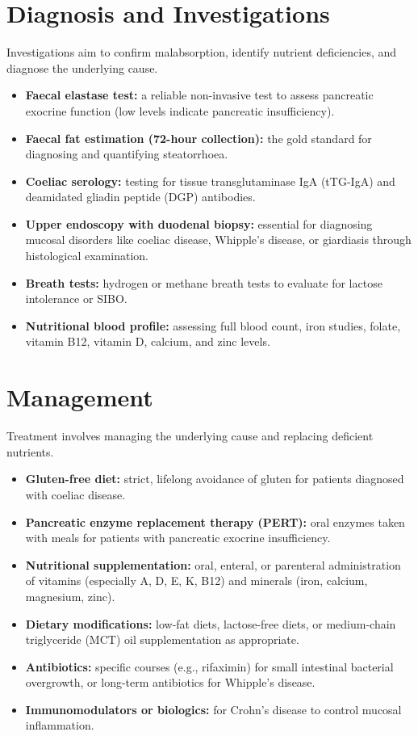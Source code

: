 \section*{Diagnosis and Investigations}
Investigations aim to confirm malabsorption, identify nutrient deficiencies, and diagnose the underlying cause.
\begin{itemize}
    \item \textbf{Faecal elastase test:} a reliable non-invasive test to assess pancreatic exocrine function (low levels indicate pancreatic insufficiency).
    \item \textbf{Faecal fat estimation (72-hour collection):} the gold standard for diagnosing and quantifying steatorrhoea.
    \item \textbf{Coeliac serology:} testing for tissue transglutaminase IgA (tTG-IgA) and deamidated gliadin peptide (DGP) antibodies.
    \item \textbf{Upper endoscopy with duodenal biopsy:} essential for diagnosing mucosal disorders like coeliac disease, Whipple's disease, or giardiasis through histological examination.
    \item \textbf{Breath tests:} hydrogen or methane breath tests to evaluate for lactose intolerance or SIBO.
    \item \textbf{Nutritional blood profile:} assessing full blood count, iron studies, folate, vitamin B12, vitamin D, calcium, and zinc levels.
\end{itemize}

\section*{Management}
Treatment involves managing the underlying cause and replacing deficient nutrients.
\begin{itemize}
    \item \textbf{Gluten-free diet:} strict, lifelong avoidance of gluten for patients diagnosed with coeliac disease.
    \item \textbf{Pancreatic enzyme replacement therapy (PERT):} oral enzymes taken with meals for patients with pancreatic exocrine insufficiency.
    \item \textbf{Nutritional supplementation:} oral, enteral, or parenteral administration of vitamins (especially A, D, E, K, B12) and minerals (iron, calcium, magnesium, zinc).
    \item \textbf{Dietary modifications:} low-fat diets, lactose-free diets, or medium-chain triglyceride (MCT) oil supplementation as appropriate.
    \item \textbf{Antibiotics:} specific courses (e.g., rifaximin) for small intestinal bacterial overgrowth, or long-term antibiotics for Whipple's disease.
    \item \textbf{Immunomodulators or biologics:} for Crohn's disease to control mucosal inflammation.
\end{itemize}

